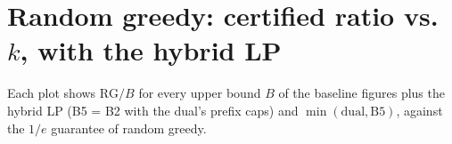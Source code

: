 \documentclass[twocolumn]{article}
\begin{document}
\section*{Random greedy: certified ratio vs.\ $k$, with the hybrid LP}
Each plot shows $\mathrm{RG}/B$ for every upper bound $B$ of the baseline figures plus the hybrid
LP (B5 = B2 with the dual's prefix caps) and $\min(\mathrm{dual}, \mathrm{B5})$, against the $1/e$
guarantee of random greedy.








\end{document}
